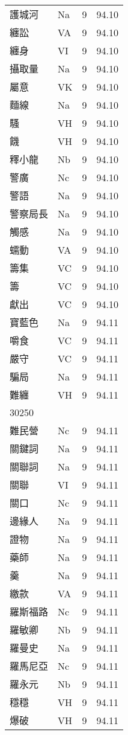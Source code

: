 \documentclass[twocolumn]{book}
\begin{document}
\begin{supertabular}{llrr}
護城河 & Na & 9 &  94.10\\
纏訟 & VA & 9 &  94.10\\
纏身 & VI & 9 &  94.10\\
攝取量 & Na & 9 &  94.10\\
屬意 & VK & 9 &  94.10\\
麵線 & Na & 9 &  94.10\\
騷 & VH & 9 &  94.10\\
饑 & VH & 9 &  94.10\\
釋小龍 & Nb & 9 &  94.10\\
警廣 & Nc & 9 &  94.10\\
警語 & Na & 9 &  94.10\\
警察局長 & Na & 9 &  94.10\\
觸感 & Na & 9 &  94.10\\
蠕動 & VA & 9 &  94.10\\
籌集 & VC & 9 &  94.10\\
籌 & VC & 9 &  94.10\\
獻出 & VC & 9 &  94.10\\
寶藍色 & Na & 9 &  94.11\\
嚼食 & VC & 9 &  94.11\\
嚴守 & VC & 9 &  94.11\\
騙局 & Na & 9 &  94.11\\
難纏 & VH & 9 &  94.11\\
30250\\
難民營 & Nc & 9 &  94.11\\
關鍵詞 & Na & 9 &  94.11\\
關聯詞 & Na & 9 &  94.11\\
關聯 & VI & 9 &  94.11\\
關口 & Nc & 9 &  94.11\\
邊緣人 & Na & 9 &  94.11\\
證物 & Na & 9 &  94.11\\
藥師 & Na & 9 &  94.11\\
羹 & Na & 9 &  94.11\\
繳款 & VA & 9 &  94.11\\
羅斯福路 & Nc & 9 &  94.11\\
羅敏卿 & Nb & 9 &  94.11\\
羅曼史 & Na & 9 &  94.11\\
羅馬尼亞 & Nc & 9 &  94.11\\
羅永元 & Nb & 9 &  94.11\\
穩穩 & VH & 9 &  94.11\\
爆破 & VH & 9 &  94.11\\

\end{supertabular}
\end{document}
